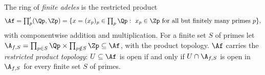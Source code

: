 The ring of \emph{finite adeles} is the restricted product
\[
  \Af=\textstyle\prod'_p(\Qp,\Zp)=\{x=(x_p)_p\in\prod_p\Qp:\ x_p\in\Zp\text{ for all but finitely many primes }p\},
\]
with componentwise addition and multiplication. For a finite set $S$ of primes let
$\A_{f,S}=\prod_{p\in S}\Qp\times\prod_{p\notin S}\Zp\subseteq\Af$, with the product topology. $\Af$ carries the
\emph{restricted product topology}: $U\subseteq\Af$ is open if and only if $U\cap\A_{f,S}$ is open in $\A_{f,S}$ for
every finite set $S$ of primes.
